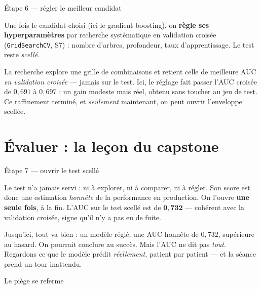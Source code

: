 \documentclass[aspectratio=169,11pt]{beamer}
\begin{document}
\begin{frame}{Étape 6 — régler le meilleur candidat}
\begin{ucaddef}
{\small Une fois le candidat choisi (ici le gradient boosting), on \textbf{règle ses hyperparamètres} par recherche systématique en validation croisée (\texttt{GridSearchCV}, S7) : nombre d'arbres, profondeur, taux d'apprentissage. Le test reste \emph{scellé}.}
\end{ucaddef}
{\small La recherche explore une grille de combinaisons et retient celle de meilleure AUC \emph{en validation croisée} — jamais sur le test. Ici, le réglage fait passer l'AUC croisée de $0{,}691$ à $0{,}697$ : un gain modeste mais réel, obtenu sans toucher au jeu de test. Ce raffinement terminé, et \emph{seulement} maintenant, on peut ouvrir l'enveloppe scellée.}
\end{frame}

\section{Évaluer : la leçon du capstone}

\begin{frame}{Étape 7 — ouvrir le test scellé}
\begin{ucadfront}
{\small Le test n'a jamais servi : ni à explorer, ni à comparer, ni à régler. Son score est donc une estimation \emph{honnête} de la performance en production. On l'ouvre \textbf{une seule fois}, à la fin. L'AUC sur le test scellé est de $\mathbf{0{,}732}$ — cohérent avec la validation croisée, signe qu'il n'y a pas eu de fuite.}
\end{ucadfront}
{\small Jusqu'ici, tout va bien : un modèle réglé, une AUC honnête de $0{,}732$, supérieure au hasard. On pourrait conclure au succès. Mais l'AUC ne dit pas \emph{tout}. Regardons ce que le modèle prédit \emph{réellement}, patient par patient — et la séance prend un tour inattendu.}
\end{frame}

\begin{frame}{Le piège se referme}
\end{frame}
\end{document}
